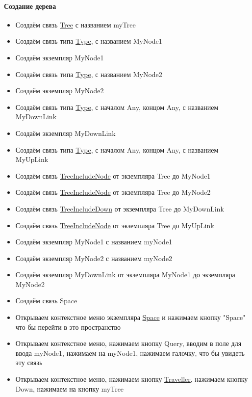 \documentclass{article}
\begin{document}
\paragraph{Создание дерева}
\begin{itemize}
  \item Создаём связь \hyperlink{Tree}{Tree} с названием myTree
  \item Создаём связь типа \hyperlink{Type.Def}{Type}, с названием MyNode1
  \item Создаём экземпляр MyNode1
  \item Создаём связь типа \hyperlink{Type.Def}{Type}, с названием MyNode2
  \item Создаём экземпляр MyNode2
  \item Создаём связь типа \hyperlink{Type.Def}{Type}, с началом Any, концом Any, с названием MyDownLink
  \item Создаём экземпляр MyDownLink
  \item Создаём связь типа \hyperlink{Type.Def}{Type}, с началом Any, концом Any, с названием MyUpLink
  \item Создаём связь \hyperlink{TreeIncludeNode.Def}{TreeIncludeNode} от экземпляра Tree до MyNode1
  \item Создаём связь \hyperlink{TreeIncludeNode.Def}{TreeIncludeNode} от экземпляра Tree до MyNode2
  \item Создаём связь \hyperlink{TreeIncludeDown.Def}{TreeIncludeDown} от экземпляра Tree до MyDownLink
  \item Создаём связь \hyperlink{TreeIncludeNode.Def}{TreeIncludeNode} от экземпляра Tree до MyUpLink
  \item Создаём экземпляр MyNode1 с названием myNode1
  \item Создаём экземпляр MyNode2 с названием myNode2
  \item Создаём экземпляр MyDownLink от экземпляра MyNode1 до экземпляра MyNode2
  \item Создаём связь \hyperlink{Space.Def}{Space}
  \item Открываем контекстное меню экземпляра \hyperlink{Space.Def}{Space} и нажимаем кнопку "Space" что бы перейти в это пространство
  \item Открываем контекстное меню, нажимаем кнопку Query, вводим в поле для ввода myNode1, нажимаем на myNode1, нажимаем галочку, что бы увидеть эту связь
  \item Открываем контекстное меню, нажимаем кнопку \hyperlink{Traveller.Def}{Traveller}, нажимаем кнопку Down, нажимаем на кнопку myTree

\end{itemize}
\end{document}
